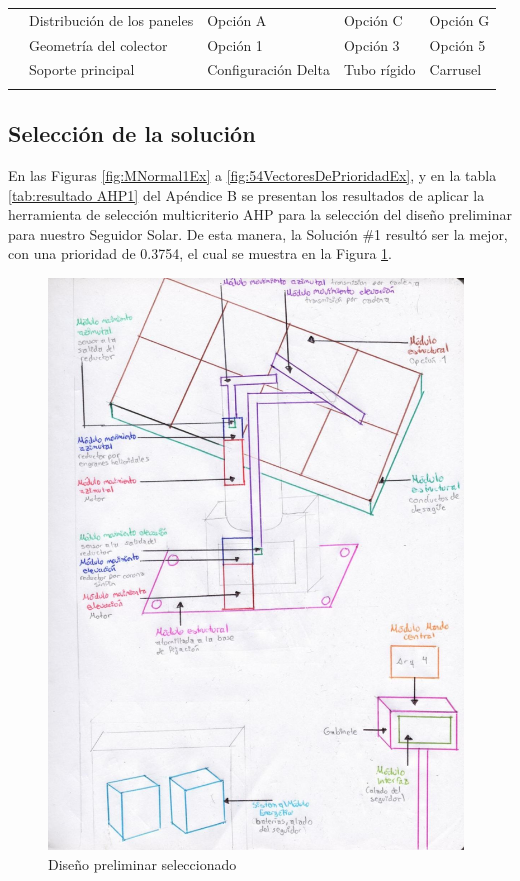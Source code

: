\begin{longtable}{@{}|p{2cm}|p{2.5cm}|p{2.5cm}|p{2.5cm}|p{2.5cm}|}
 	\cline{2-5} & Distribución de los paneles & Opción A & Opción C & Opción G 
	\\ 
	\cline{2-5} & Geometría del colector & Opción 1 & Opción 3 & Opción 5 
	\\ 
	\cline{2-5} & Soporte principal & Configuración Delta & Tubo rígido & Carrusel 
	\\ \hline %
	\label{tabla:morfologico}
\end{longtable}

\subsection{Selección de la solución}
En las Figuras \ref{fig:MNormal1Ex} a \ref{fig:54VectoresDePrioridadEx}, y en la tabla \ref{tab:resultado AHP1} del Apéndice B se presentan los resultados de aplicar la herramienta de selección multicriterio AHP para la selección del diseño preliminar para nuestro Seguidor Solar. De esta manera, la Solución \#1 resultó ser la mejor, con una prioridad de 0.3754,  el cual se muestra en la Figura \ref{fig:DC}.

\begin{figure}[H]
	\centering
	\includegraphics[width=11cm]{imagenes/DC}
	\caption{Diseño preliminar seleccionado}
	\label{fig:DC}
\end{figure}

